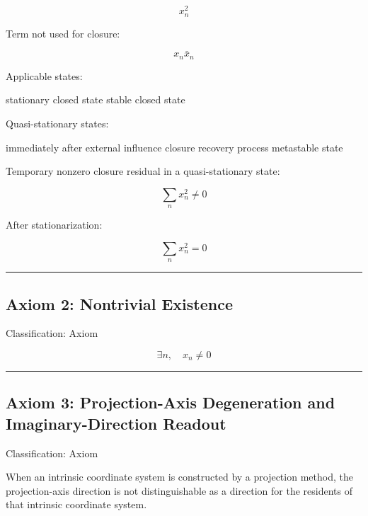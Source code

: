 \documentclass[
  a4paper,
]{article}
\newenvironment{Shaded}{}{}
\newcommand{\NormalTok}[1]{#1}
\begin{document}
\[
x_n^2
\]

Term not used for closure:

\[
x_n\bar{x}_n
\]

Applicable states:

\begin{Shaded}
\begin{Highlighting}[]
\NormalTok{stationary closed state}
\NormalTok{stable closed state}
\end{Highlighting}
\end{Shaded}

Quasi-stationary states:

\begin{Shaded}
\begin{Highlighting}[]
\NormalTok{immediately after external influence}
\NormalTok{closure recovery process}
\NormalTok{metastable state}
\end{Highlighting}
\end{Shaded}

Temporary nonzero closure residual in a quasi-stationary state:

\[
\sum_n x_n^2\ne0
\]

After stationarization:

\[
\sum_n x_n^2=0
\]

\begin{center}\rule{0.5\linewidth}{0.5pt}\end{center}

\subsection{Axiom 2: Nontrivial
Existence}\label{axiom-2-nontrivial-existence}

Classification: Axiom

\[
\exists n,\quad x_n\neq0
\]

\begin{center}\rule{0.5\linewidth}{0.5pt}\end{center}

\subsection{Axiom 3: Projection-Axis Degeneration and
Imaginary-Direction
Readout}\label{axiom-3-projection-axis-degeneration-and-imaginary-direction-readout}

Classification: Axiom

When an intrinsic coordinate system is constructed by a projection
method, the projection-axis direction is not distinguishable as a
direction for the residents of that intrinsic coordinate system.
\end{document}
